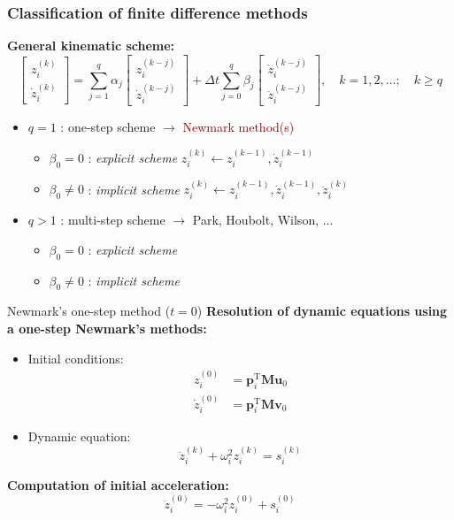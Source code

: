 \documentclass[aspectratio=169]{beamer}
\begin{document}
\begin{frame}
  \frametitle{Classification of finite difference methods}
  \textbf{General kinematic scheme:}
  \[
    \begin{bmatrix}
      z_i^{(k)} \\
      \dot{z}_i^{(k)}
    \end{bmatrix}
    =
    \sum_{j=1}^{q} \alpha_j
    \begin{bmatrix}
      z_i^{(k-j)} \\
      \dot{z}_i^{(k-j)}
    \end{bmatrix}
    +
    \Delta t \sum_{j=0}^{q} \beta_j
    \begin{bmatrix}
      \dot{z}_i^{(k-j)} \\
      \ddot{z}_i^{(k-j)}
    \end{bmatrix}, \quad k = 1, 2, \dots; \quad k \geq q
  \]
  \begin{itemize}
    \item $q = 1$ : one-step scheme $\rightarrow$ \textcolor{darkred}{Newmark method(s)}
          \begin{itemize}
            \item $\beta_0 = 0$ : \emph{explicit scheme} \hfill $z_i^{(k)} \leftarrow z_i^{(k-1)}, \dot{z}_i^{(k-1)}$
            \item $\beta_0 \ne 0$ : \emph{implicit scheme} \hfill $z_i^{(k)} \leftarrow z_i^{(k-1)}, \dot{z}_i^{(k-1)}, \ddot{z}_i^{(k)}$
          \end{itemize}
    \item $q > 1$ : multi-step scheme $\rightarrow$ Park, Houbolt, Wilson, ...
          \begin{itemize}
            \item $\beta_0 = 0$ : \emph{explicit scheme}
            \item $\beta_0 \ne 0$ : \emph{implicit scheme}
          \end{itemize}
  \end{itemize}
\end{frame}


\begin{frame}{Newmark's one-step method ($t=0$)}
  \textbf{Resolution of dynamic equations using a one-step Newmark's methods:}
  \begin{itemize}
    \item Initial conditions:
          \begin{align*}
            z_i^{(0)}       & = \mathbf{p}_{i}^\mathrm{T} \mathbf M\mathbf{u}_0 \\
            \dot{z}_i^{(0)} & = \mathbf{p}_{i}^\mathrm{T}\mathbf M \mathbf{v}_0
          \end{align*}
    \item Dynamic equation:
          $$\ddot{z}_i^{(k)} + \omega_{i}^2 z_i^{(k)}  = s_{i}^{(k)}$$
  \end{itemize}
  \begin{block}{}
    \textbf{Computation of initial acceleration:}
    $$\ddot{z}_i^{(0)} = - \omega_{i}^2 z_i^{(0)}  + s_{i}^{(0)}$$
  \end{block}
\end{frame}
\end{document}
